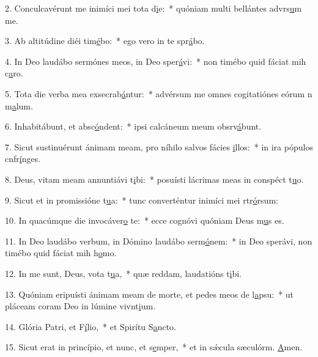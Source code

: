 2. Conculcavérunt me inimíci mei tota d\uline{i}e:~* quóniam multi bellántes advrs\uline{u}m me.\par 
3. Ab altitúdine diéi tim\uline{é}bo:~* ego vero in te spr\uline{á}bo.\par 
4. In Deo laudábo sermónes meos, in Deo sper\uline{á}vi:~* non timébo quid fáciat mih c\uline{a}ro.\par 
5. Tota die verba mea exsecrab\uline{á}ntur:~* advérsum me omnes cogitatiónes eórum n m\uline{a}lum.\par 
6. Inhabitábunt, et absc\uline{ó}ndent:~* ipsi calcáneum meum obsrv\uline{á}bunt.\par 
7. Sicut sustinuérunt ánimam meam, pro níhilo salvos fácies \uline{i}llos:~* in ira pópulos cnfr\uline{í}nges.\par 
8. Deus, vitam meam annuntiávi t\uline{i}bi:~* posuísti lácrimas meas in conspéct t\uline{u}o.\par 
9. Sicut et in promissióne t\uline{u}a:~* tunc converténtur inimíci mei rtr\uline{ó}rsum:\par 
10. In quacúmque die invocáver\uline{o} te:~* ecce cognóvi quóniam Deus m\uline{u}s es.\par 
11. In Deo laudábo verbum, in Dómino laudábo serm\uline{ó}nem:~* in Deo sperávi, non timébo quid fáciat mih h\uline{o}mo.\par 
12. In me sunt, Deus, vota t\uline{u}a,~* quæ reddam, laudatións t\uline{i}bi.\par 
13. Quóniam eripuísti ánimam meam de morte, et pedes meos de l\uline{a}psu:~* ut pláceam coram Deo in lúmine vivnt\uline{i}um.\par 
14. Glória Patri, et F\uline{í}lio,~* et Spirítu S\uline{a}ncto.\par 
15. Sicut erat in princípio, et nunc, et s\uline{e}mper,~* et in sǽcula sæculórm. \uline{A}men.\par 
